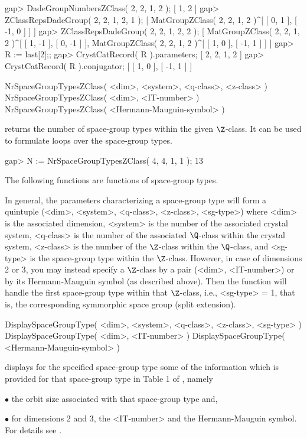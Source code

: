 \beginexample
gap> DadeGroupNumbersZClass( 2, 2, 1, 2 );
[ 1, 2 ]
gap> ZClassRepsDadeGroup( 2, 2, 1, 2, 1 );
[ MatGroupZClass( 2, 2, 1, 2 )^[ [ 0, 1 ], [ -1, 0 ] ] ]
gap> ZClassRepsDadeGroup( 2, 2, 1, 2, 2 );
[ MatGroupZClass( 2, 2, 1, 2 )^[ [ 1, -1 ], [ 0, -1 ] ],
  MatGroupZClass( 2, 2, 1, 2 )^[ [ 1, 0 ], [ -1, 1 ] ] ]
gap> R := last[2];;
gap> CrystCatRecord( R ).parameters;
[ 2, 2, 1, 2 ]
gap> CrystCatRecord( R ).conjugator;
[ [ 1, 0 ], [ -1, 1 ] ]
\endexample


\>NrSpaceGroupTypesZClass( <dim>, <system>, <q-class>, <z-class> )
\>NrSpaceGroupTypesZClass( <dim>, <IT-number> )
\>NrSpaceGroupTypesZClass( <Hermann-Mauguin-symbol> )

returns the number of space-group types within the given $\Z$-class.
It can be used to formulate loops over the space-group types.

\beginexample
gap> N := NrSpaceGroupTypesZClass( 4, 4, 1, 1 );
13
\endexample

The following functions are functions of space-group types.

In general, the parameters characterizing a space-group type will form
a quintuple (<dim>, <system>, <q-class>, <z-class>, <sg-type>) where
<dim> is the associated dimension, <system> is the number of the
associated crystal system, <q-class> is the number of the associated
$\Q$-class within the crystal system, <z-class> is the number of the
$\Z$-class within the $\Q$-class, and <sg-type> is the space-group
type within the $\Z$-class.  However, in case of dimensions 2 or 3,
you may instead specify a $\Z$-class by a pair (<dim>, <IT-number>)
or by its Hermann-Mauguin symbol (as described above).  Then the
function will handle the first space-group type within that
$\Z$-class, i.e., <sg-type> = 1, that is, the corresponding
symmorphic space group (split extension).

\>DisplaySpaceGroupType( <dim>, <system>, <q-class>, <z-class>, <sg-type> )
\>DisplaySpaceGroupType( <dim>, <IT-number> )
\>DisplaySpaceGroupType( <Hermann-Mauguin-symbol> )

displays for the specified space-group type some of the information
which is provided for that space-group type in Table 1 of
\cite{BBNWZ78}, namely
\beginlist%
\item{$\bullet$} the orbit size associated with that space-group type and,
\item{$\bullet$} for dimensions  2 and 3,  the <IT-number>  and  the 
    Hermann-Mauguin symbol.
\endlist
For details see \cite{BBNWZ78}.

